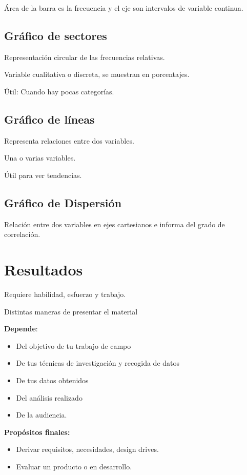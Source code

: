 \documentclass[12pt, twoside, openright]{report} %
\begin{document}
Área de la barra es la frecuencia y el eje son intervalos de variable
continua.

\subsection{Gráfico de sectores}

Representación circular de las frecuencias relativas.

Variable cualitativa o discreta, se muestran en porcentajes.

Útil: Cuando hay pocas categorías.

\subsection{Gráfico de líneas}

Representa relaciones entre dos variables.

Una o varias variables.

Útil para ver tendencias.

\subsection{Gráfico de
	Dispersión}

Relación entre dos variables en ejes cartesianos e informa del grado de
correlación.

\section{Resultados}

Requiere habilidad, esfuerzo y trabajo.

Distintas maneras de presentar el material

\textbf{Depende}:

\begin{itemize}
	\item Del objetivo de tu trabajo de campo
	\item De tus técnicas de investigación y recogida de datos
	\item De tus datos obtenidos
	\item Del análisis realizado
	\item De la audiencia.
\end{itemize}

\textbf{Propósitos finales:}

\begin{itemize}
	\item Derivar requisitos, necesidades, design drives.
	\item Evaluar un producto o en desarrollo.
\end{itemize}
\end{document}
